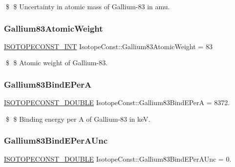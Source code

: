 \$ \$ Uncertainty in atomic mass of Gallium-\/83 in amu. \mbox{\label{group___isotope_const-_gallium-_ga83_gadae8c0547a0573df6a41caf8f7a9fee8}} 
\subsubsection{\texorpdfstring{Gallium83\+Atomic\+Weight}{Gallium83AtomicWeight}}
{\footnotesize\ttfamily \mbox{\hyperlink{group___isotope_const-_macros_ga5f18360b3e99483a35c32d789e62621c}{I\+S\+O\+T\+O\+P\+E\+C\+O\+N\+S\+T\+\_\+\+I\+NT}} Isotope\+Const\+::\+Gallium83\+Atomic\+Weight = 83}

\$ \$ Atomic weight of Gallium-\/83. \mbox{\label{group___isotope_const-_gallium-_ga83_ga865e16badc79553e20939d57bc2a23bc}} 
\subsubsection{\texorpdfstring{Gallium83\+Bind\+E\+PerA}{Gallium83BindEPerA}}
{\footnotesize\ttfamily \mbox{\hyperlink{group___isotope_const-_macros_ga8f45a7272ce02c0b4c65c44636ed719a}{I\+S\+O\+T\+O\+P\+E\+C\+O\+N\+S\+T\+\_\+\+D\+O\+U\+B\+LE}} Isotope\+Const\+::\+Gallium83\+Bind\+E\+PerA = 8372.}

\$ \$ Binding energy per A of Gallium-\/83 in keV. \mbox{\label{group___isotope_const-_gallium-_ga83_ga92ec9a157fc39ffe2dbe8469826a6bba}} 
\subsubsection{\texorpdfstring{Gallium83\+Bind\+E\+Per\+A\+Unc}{Gallium83BindEPerAUnc}}
{\footnotesize\ttfamily \mbox{\hyperlink{group___isotope_const-_macros_ga8f45a7272ce02c0b4c65c44636ed719a}{I\+S\+O\+T\+O\+P\+E\+C\+O\+N\+S\+T\+\_\+\+D\+O\+U\+B\+LE}} Isotope\+Const\+::\+Gallium83\+Bind\+E\+Per\+A\+Unc = 0.}

